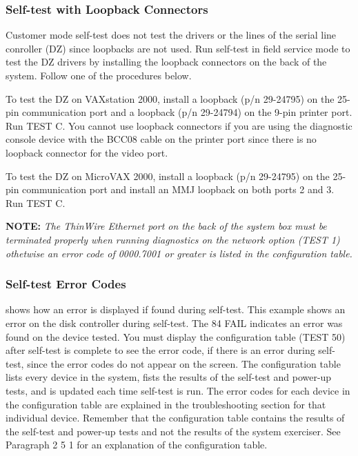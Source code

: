 \subsubsection{Self-test with Loopback Connectors}

Customer mode self-test does not test the drivers or the lines of the serial
line conroller (DZ) since loopbacks are not used. Run self-test in field 
service mode to test the DZ drivers by installing the loopback connectors on
the back of the system. Follow one of the procedures below.

To test the DZ on VAXstation 2000, install a loopback (p/n 29-24795) on
the 25-pin communication port and a loopback (p/n 29-24794) on the 9-pin
printer port. Run TEST C. You cannot use loopback connectors if you are
using the diagnostic console device with the BCC08 cable on the printer
port since there is no loopback connector for the video port.

To test the DZ on MicroVAX 2000, install a loopback (p/n 29-24795) on the
25-pin communication port and install an MMJ loopback on both ports 2
and 3. Run TEST C.

\textbf{NOTE:} \textit{The ThinWire Ethernet port on the back of the 
system box must be terminated properly when running diagnostics on the 
network option (TEST 1) othetwise an error code of 0000.7001 or greater 
is listed in the configuration table.}

\subsubsection{Self-test Error Codes}

 shows how an error is displayed if found during self-test. This
example shows an error on the disk controller during self-test. The 84 FAIL
indicates an error was found on the device tested. You must display the
configuration table (TEST 50) after self-test is complete to see the error code,
if there is an error during self-test, since the error codes do not appear on
the screen. The configuration table lists every device in the system, fists the
results of the self-test and power-up tests, and is updated each time self-test
is run. The error codes for each device in the configuration table are 
explained in the troubleshooting section for that individual device. Remember
that the configuration table contains the results of the self-test and power-up
tests and not the results of the system exerciser. See Paragraph 2 5 1 for an
explanation of the configuration table.

